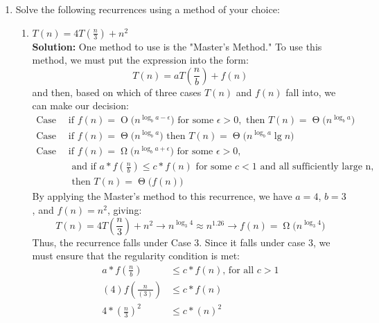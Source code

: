 \documentclass[11pts]{article}
\newcommand{\BigO}[1]{\ensuremath{\operatorname{O}\bigl(#1\bigr)}}
\newcommand{\BigTheta}[1]{\ensuremath{\operatorname{\Theta}\bigl(#1\bigr)}}
\newcommand{\BigOmega}[1]{\ensuremath{\operatorname{\Omega}\bigl(#1\bigr)}}
\begin{document}
\begin{enumerate}
\item Solve the following recurrences using a method of your choice:
  \begin{enumerate}
  \item $ T(n) = 4T(\frac{n}{3}) + n^{2} $ \\

  \textbf{Solution:} One method to use is the "Master's Method." To use this
  method, we must put the expression into the form:
  $$ T(n) = aT(\frac{n}{b}) + f(n) $$
  and then, based on which of three cases $T(n)$ and $f(n)$ fall
  into, we can make our decision:
  \begin{align*}
  \text{Case 1: } & \text{if } f(n) = \BigO{n^{\log_{b}{a-\epsilon}}}
      \text{ for some } \epsilon > 0,
      \text{ then } T(n) = \BigTheta{n^{\log_{b}{a}}} \\
  \text{Case 2: } & \text{if } f(n) = \BigTheta{n^{\log_{b}{a}}}
      \text{ then } T(n) = \BigTheta{n^{\log_{b}{a}} \lg{n}} \\
  \text{Case 3: } & \text{if } f(n) = \BigOmega{n^{\log_{b}{a+\epsilon}}}
      \text{ for some } \epsilon > 0, \\
      & \text{ and if } a*f(\frac{n}{b}) \le c*f(n)
        \text{ for some } c < 1 \text{ and all sufficiently large n, } \\
      & \text{ then } T(n) = \BigTheta{f(n)}
  \end{align*}
  By applying the Master's method to this recurrence, we have
  $a=4$, $b=3$, and $f(n) = n^{2}$, giving:
  \[ T(n) = 4T(\frac{n}{3}) + n^{2} \rightarrow n^{\log_{3}{4}}\approx
        n^{1.26} \rightarrow f(n) = \BigOmega{n^{\log_{3}{4}}} \]
  Thus, the recurrence falls under Case 3. Since it falls under case 3,
  we must ensure that the regularity condition is met:
  \begin{align*}
       a*f(\frac{n}{b}) &\le c*f(n) \text{, for all $c > 1$} \\
    (4)f(\frac{n}{(3)}) &\le c*f(n) \\
    4*(\frac{n}{3})^{2} &\le c*(n)^{2} \\

\end{align*}
\end{enumerate}
\end{enumerate}
\end{document}
